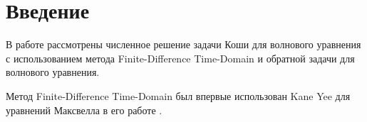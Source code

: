 \section*{Введение}

В работе рассмотрены
численное решение задачи Коши для волнового уравнения
с использованием метода Finite-Difference Time-Domain
и
обратной задачи для волнового уравнения.

Метод Finite-Difference Time-Domain
был впервые использован
Kane Yee
для уравнений Максвелла
в его работе
\cite{numerical_solution_ibv_involving_maxwells_equations_in_isotropic_media}.
